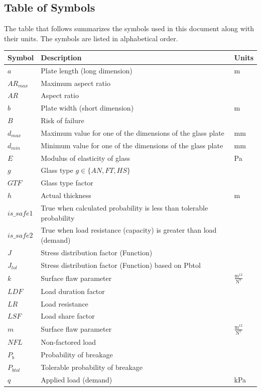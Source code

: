 \documentclass[12pt]{article}
\begin{document}
\subsection{Table of Symbols}
\label{Sec:TablofSymb}
The table that follows summarizes the symbols used in this document along with their units. The symbols are listed in alphabetical order.
\begin{longtabu}{l X[l] l}
\toprule
Symbol & Description & Units
\\
\midrule
$a$ & Plate length (long dimension) & m
\\
${AR_{max}}$ & Maximum aspect ratio & 
\\
$AR$ & Aspect ratio & 
\\
$b$ & Plate width (short dimension) & m
\\
$B$ & Risk of failure & 
\\
${d_{max}}$ & Maximum value for one of the dimensions of the glass plate & mm
\\
${d_{min}}$ & Minimum value for one of the dimensions of the glass plate & mm
\\
$E$ & Modulus of elasticity of glass & Pa
\\
$g$ & Glass type $g\in{}\{AN, FT, HS\}$ & 
\\
$GTF$ & Glass type factor & 
\\
$h$ & Actual thickness & m
\\
$is\_safe1$ & True when calculated probability is less than tolerable probability & 
\\
$is\_safe2$ & True when load resistance (capacity) is greater than load (demand) & 
\\
$J$ & Stress distribution factor (Function) & 
\\
${J_{tol}}$ & Stress distribution factor (Function) based on Pbtol & 
\\
$k$ & Surface flaw parameter & $\frac{\text{m}^{12}}{\text{N}^{7}}$
\\
$LDF$ & Load duration factor & 
\\
$LR$ & Load resistance & 
\\
$LSF$ & Load share factor & 
\\
$m$ & Surface flaw parameter & $\frac{\text{m}^{12}}{\text{N}^{7}}$
\\
$NFL$ & Non-factored load & 
\\
${P_{b}}$ & Probability of breakage & 
\\
${P_{btol}}$ & Tolerable probability of breakage & 
\\
$q$ & Applied load (demand) & kPa

\end{longtabu}
\end{document}
